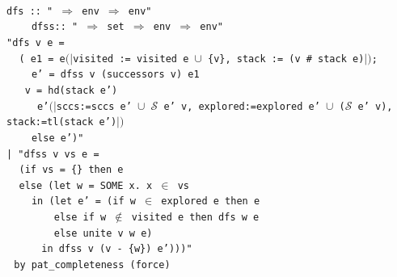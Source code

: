\documentclass[a4 paper, 12pt]{article}
\newcommand{\where}{{\color{isa_green}{where}}}
\renewcommand{\and}{{\color{isa_green}{and}}}
\newcommand{\generic}[1]{{\color{isa_purple}{\textquotesingle#1}}}
\newcommand{\isa}[1]{\small\texttt{\\\noindent#1}}
\newcommand{\bblue}[1]{{\color{isa_blue}{#1}}}
\newcommand{\env}[1]{$(\!|$#1$|\!)$}
\theoremstyle{definition}
\begin{document}
\BlankLine

\isa{
    {\color{isa_blue}{function}} dfs :: "\generic{v} $\Rightarrow$ \generic{v} env $\Rightarrow$ \generic{v} env" \and{}\\
    $~~~~~~~~~~$dfss:: "\generic{v} $\Rightarrow$ \generic{v} set $\Rightarrow$ \generic{v} env $\Rightarrow$ \generic{v} env" \where\\
    "{\color{isa_dark_blue}dfs} {\color{isa_dark_green}v e} =\\
    $~~~~~$({\color{isa_blue}{let}} {\color{isa_dark_green}e1} = {\color{isa_dark_green}e}\env{visited := visited e $\cup$ \{{\color{isa_dark_green}v}\}, stack := ({\color{isa_dark_green}v} \# stack {\color{isa_dark_green}e})};\\
    $~~~~~~~~~~${\color{isa_dark_green}e'} = {\color{isa_dark_blue}dfss} {\color{isa_dark_green}v} (successors {\color{isa_dark_green}v}) {\color{isa_dark_green}e1}\\
    $~~~~~${\color{isa_blue}{in if}} {\color{isa_dark_green}v} = hd(stack {\color{isa_dark_green}e'})\\
    $~~~~~~~~~~${\color{isa_blue}{then}} {\color{isa_dark_green}e'}\env{sccs:=sccs {\color{isa_dark_green}e'} $\cup$ {$\mathcal{S}$ {\color{isa_dark_green}e' v}}, explored:=explored {\color{isa_dark_green}e'} $\cup$ ($\mathcal{S}$ {\color{isa_dark_green}e' v}), stack:=tl(stack {\color{isa_dark_green}e'})}\\
    $~~~~~~~~~~${\color{isa_blue}else} {\color{isa_dark_green}e'})"\\
    | "{\color{isa_dark_blue}dfss} {\color{isa_dark_green}v vs e} =\\
    $~~~~~$({\color{isa_blue}if} {\color{isa_dark_green}vs} = \{\} {\color{isa_blue}then} {\color{isa_dark_green}e}\\
    $~~~~~${\color{isa_blue}else} ({\color{isa_blue}let} {\color{isa_dark_green}w} = SOME {\color{isa_dark_green}x}. {\color{isa_dark_green}x} $\in$ {\color{isa_dark_green}vs}\\
    $~~~~~~~~~~${\color{isa_blue}in} ({\color{isa_blue}let} {\color{isa_dark_green}e'} = ({\color{isa_blue}if} {\color{isa_dark_green}w} $\in$ explored {\color{isa_dark_green}e} {\color{isa_blue}then} {\color{isa_dark_green}e}\\
    $~~~~~~~~~~~~~~~~~~~${\color{isa_blue}else if} {\color{isa_dark_green}w} $\notin$ visited {\color{isa_dark_green}e} {\color{isa_blue}then} {\color{isa_dark_blue}dfs} {\color{isa_dark_green}w e}\\
    $~~~~~~~~~~~~~~~~~~~${\color{isa_blue}else} unite {\color{isa_dark_green}v w e})\\
    $~~~~~~~~~~~~~~${\color{isa_blue}in} {\color{isa_dark_blue}dfss} {\color{isa_dark_green}v} ({\color{isa_dark_green}v} - \{{\color{isa_dark_green}w}\}) {\color{isa_dark_green}e'})))"\\
    $~~~${\color{isa_blue}by} pat\_completeness (force\bblue{+})\\
}
\end{document}
